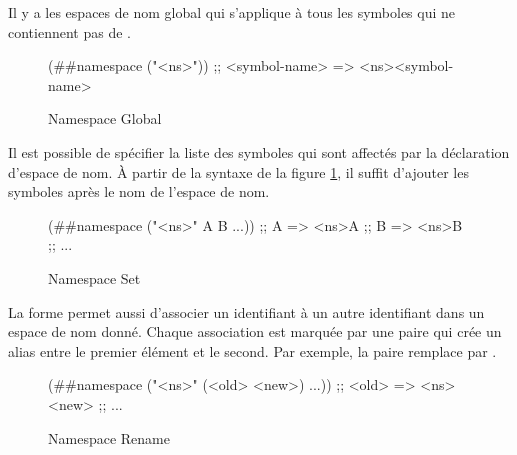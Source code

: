 Il y a les espaces de nom global qui s'applique à tous les symboles qui ne
contiennent pas de \lstcode{#}. \\
\begin{figure}[ht]
  \centering
  \begin{mplisting}{0.6}
(##namespace ("<ns>"))
;; <symbol-name> => <ns><symbol-name>
\end{mplisting}
  \caption{Namespace Global}
  \label{fig:forms->namespace-global}
\end{figure}

Il est possible de spécifier la liste des symboles qui sont affectés par la
déclaration d'espace de nom. À partir de la syntaxe de la figure
\ref{fig:forms->namespace-global}, il suffit d'ajouter les symboles après le nom
de l'espace de nom.\\
\begin{figure}[ht]
  \centering
  \begin{mplisting}{0.6}
(##namespace ("<ns>" A B ...))
;; A => <ns>A
;; B => <ns>B
;; ...
\end{mplisting}
  \caption{Namespace Set}
  \label{fig:forms->namespace-set}
\end{figure}

La forme  permet aussi d'associer un identifiant à un
autre identifiant dans un espace de nom donné. Chaque association est marquée
par une paire qui crée un alias entre le premier élément et le second. Par exemple,
la paire  remplace  par .\\
\begin{figure}[ht]
  \centering
  \begin{mplisting}{0.6}
(##namespace ("<ns>" (<old> <new>) ...))
;; <old> => <ns><new>
;; ...
\end{mplisting}
  \caption{Namespace Rename}
  \label{fig:forms->namespace-rename}
\end{figure}



